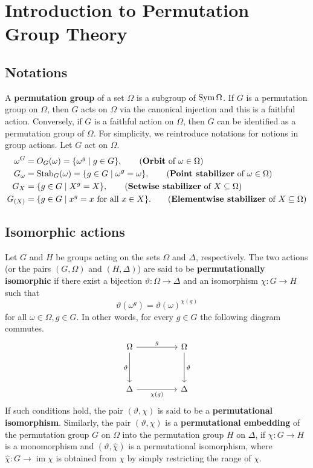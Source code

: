 \section{Introduction to Permutation Group Theory}
\subsection{Notations}
A \textbf{permutation group} of a set $\Omega$ is a subgroup of $\operatorname{Sym}\Omega$. If $G$ is a permutation group on $\Omega$, then $G$ acts on $\Omega$ via the canonical injection and this is a faithful action.  Conversely, if $G$ is a faithful action on $\Omega$, then $G$ can be identified as a permutation group of $\Omega$. For simplicity, we reintroduce notations for notions in group actions. Let $G$ act on $\Omega$.  
\begin{align*}
	\omega^G &= O_G(\omega) =\{\omega^g\mid g\in G\}, \tag{\textbf{Orbit} of $\omega \in \Omega$}
	\\
	G_{\omega} &= \operatorname{Stab}_G(\omega) = \{g\in G\mid \omega^g = \omega\}, \tag{\textbf{Point stabilizer} of $\omega\in \Omega$}
	\\
	G_{X} &=  \{g\in G\mid X^g = X\}, \tag{\textbf{Setwise stabilizer} of $X\subseteq \Omega$}
	\\
	G_{(X)} &=  \{g\in G\mid x^g = x\text{ for all }x\in X\}. \tag{\textbf{Elementwise stabilizer} of $X\subseteq \Omega$}
\end{align*}
\subsection{Isomorphic actions}
\begin{definition}
	Let $G$ and $H$ be groups acting on the sets $\Omega$ and $\Delta$, respectively. The two actions (or the pairs $(G,\Omega)$ and $(H,\Delta)$) are said to be \textbf{permutationally isomorphic} if there exist a bijection $\vartheta: \Omega \to \Delta$ and an isomorphism $\chi: G \to H$ such that
	\[ \vartheta(\omega^g) = \vartheta(\omega)^{\chi(g)} \]
	for all  $\omega \in \Omega, g \in G$. In other words, for every $g\in G$ the following diagram commutes.
	\[\begin{tikzcd}
		\Omega && \Omega \\
		\\
		\Delta && \Delta
		\arrow["g", from=1-1, to=1-3]
		\arrow["\vartheta"', from=1-1, to=3-1]
		\arrow["\vartheta", from=1-3, to=3-3]
		\arrow["{\chi(g)}"', from=3-1, to=3-3]
	\end{tikzcd}\]
	If such conditions hold, the pair $(\vartheta, \chi)$ is said to be a \textbf{permutational isomorphism}. Similarly, the pair $(\vartheta, \chi)$ is a \textbf{permutational embedding} of the permutation group $G$ on $\Omega$ into the permutation group $H$ on $\Delta$, if $\chi: G \to H$ is a monomorphism and $(\vartheta, \hat{\chi})$ is a permutational isomorphism, where $\hat{\chi}: G \to \operatorname{im}\chi$ is obtained from $\chi$ by simply restricting the range of $\chi$.
\end{definition}



